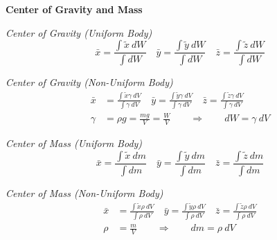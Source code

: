 \documentclass[twocolumn]{article}
\begin{document}
\textbf{Center of Gravity and Mass}

\textit{Center of Gravity (Uniform Body)}
\begin{equation*}
    \bar{x} = \frac{\displaystyle\int \tilde{x}\ dW}{\displaystyle\int dW} \hspace{1em} \bar{y} = \frac{\displaystyle\int \tilde{y}\ dW}{\displaystyle\int dW} \hspace{1em} \bar{z} = \frac{\displaystyle\int \tilde{z}\ dW}{\displaystyle\int dW}
\end{equation*}

\textit{Center of Gravity (Non-Uniform Body)}
\begin{align*}
    \bar{x} &= \frac{\displaystyle\int \tilde{x} \gamma\ dV}{\displaystyle\int \gamma\ dV} \hspace{1em} \bar{y} = \frac{\displaystyle\int \tilde{y} \gamma\ dV}{\displaystyle\int \gamma\ dV} \hspace{1em} \bar{z} = \frac{\displaystyle\int \tilde{z} \gamma\ dV}{\displaystyle\int \gamma\ dV} \\
    \gamma &= \rho g = \frac{mg}{V} = \frac{W}{V} \hspace{2em} \Rightarrow \hspace{2em} dW = \gamma\ dV
\end{align*}

\textit{Center of Mass (Uniform Body)}
\begin{equation*}
    \bar{x} = \frac{\displaystyle\int \tilde{x}\ dm}{\displaystyle\int dm} \hspace{1em} \bar{y} = \frac{\displaystyle\int \tilde{y}\ dm}{\displaystyle\int dm} \hspace{1em} \bar{z} = \frac{\displaystyle\int \tilde{z}\ dm}{\displaystyle\int dm}
\end{equation*}

\textit{Center of Mass (Non-Uniform Body)}
\begin{align*}
    \bar{x} &= \frac{\displaystyle\int \tilde{x} \rho\ dV}{\displaystyle\int \rho\ dV} \hspace{1em} \bar{y} = \frac{\displaystyle\int \tilde{y} \rho\ dV}{\displaystyle\int \rho\ dV} \hspace{1em} \bar{z} = \frac{\displaystyle\int \tilde{z} \rho\ dV}{\displaystyle\int \rho\ dV} \\
    \rho &= \frac{m}{V} \hspace{2em} \Rightarrow \hspace{2em} dm = \rho\ dV
\end{align*}
\end{document}
